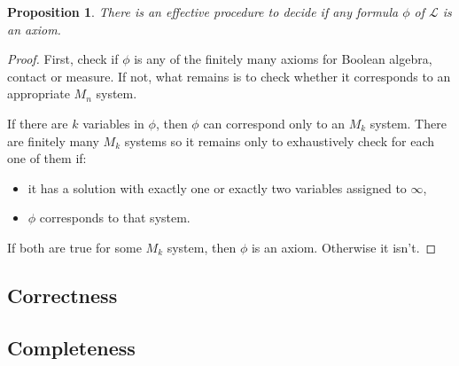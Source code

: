 \documentclass{article}
\newtheorem*{proposition}{Proposition}
\newcommand{\lang}{\mathcal{L}}
\begin{document}
\begin{proposition}
  There is an effective procedure to decide if any formula $\phi$ of $\lang$ is an axiom.
\end{proposition}
\begin{proof}
  First, check if $\phi$ is any of the finitely many axioms for Boolean algebra, contact or measure. If not, what remains is to check whether it corresponds to an appropriate $M_n$ system.

  If there are $k$ variables in $\phi$, then $\phi$ can correspond only to an $M_k$ system. There are finitely many $M_k$ systems so it remains only to exhaustively check for each one of them if:
  \begin{itemize}
  \item it has a solution with exactly one or exactly two variables assigned to $\infty$,
  \item $\phi$ corresponds to that system.
  \end{itemize}
  If both are true for some $M_k$ system, then $\phi$ is an axiom. Otherwise it isn't.
\end{proof}

\subsection{Correctness}
\subsection{Completeness}
\end{document}

